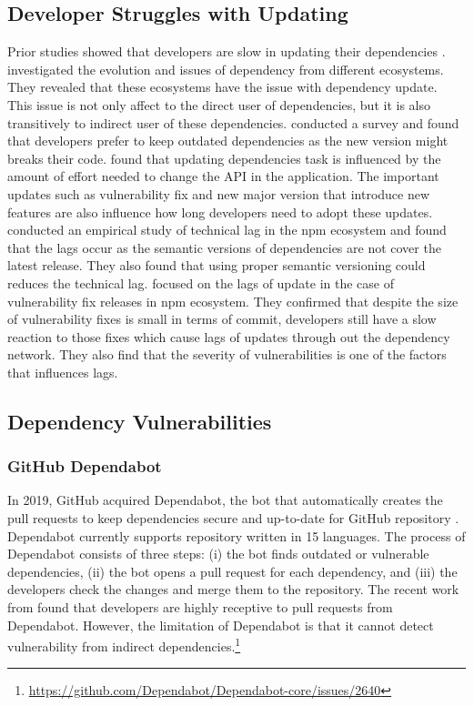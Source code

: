 \documentclass[conference]{IEEEtran}
\begin{document}
	\subsection{Developer Struggles with Updating}
	Prior studies showed that developers are slow in updating their dependencies \citep{Robbes:2012, Hora:2015, Sawant2016, Bavota:2015, Ihara:2017}.
	\citet{Decan:2017} investigated the evolution and issues of dependency from different ecosystems.
	They revealed that these ecosystems have the issue with dependency update.
	This issue is not only affect to the direct user of dependencies, but it is also transitively to indirect user of these dependencies.
	\citet{Bogart:2015} conducted a survey and found that developers prefer to keep outdated dependencies as the new version might breaks their code.
	\citet{Kula:2017} found that updating dependencies task is influenced by the amount of effort needed to change the API in the application.
	The important updates such as vulnerability fix and new major version that introduce new features are also influence how long developers need to adopt these updates.
	\citet{Decan:ICSME:2018} conducted an empirical study of technical lag in the npm ecosystem and found that the lags occur as the semantic versions of dependencies are not cover the latest release.
	They also found that using proper semantic versioning could reduces the technical lag.
	\citet{Chinthanet2021} focused on the lags of update in the case of vulnerability fix releases in npm ecosystem.
	They confirmed that despite the size of vulnerability fixes is small in terms of commit, developers still have a slow reaction to those fixes which cause lags of updates through out the dependency network.
	They also find that the severity of vulnerabilities is one of the factors that influences lags.
	
	
	\subsection{Dependency Vulnerabilities}
	\subsubsection{GitHub Dependabot}
	In 2019, GitHub acquired Dependabot, the bot that automatically creates the pull requests to keep dependencies secure and up-to-date for GitHub repository \citep{Web:Dependabot}.
	Dependabot currently supports repository written in 15 languages.
	The process of Dependabot consists of three steps: (i) the bot finds outdated or vulnerable dependencies, (ii) the bot opens a pull request for each dependency, and (iii) the developers check the changes and merge them to the repository.
	The recent work from \citet{Alfadel:MSR2021} found that developers are highly receptive to pull requests from Dependabot.
	However, the limitation of Dependabot is that it cannot detect vulnerability from indirect dependencies.\footnote{\url{https://github.com/Dependabot/Dependabot-core/issues/2640}}
\end{document}
